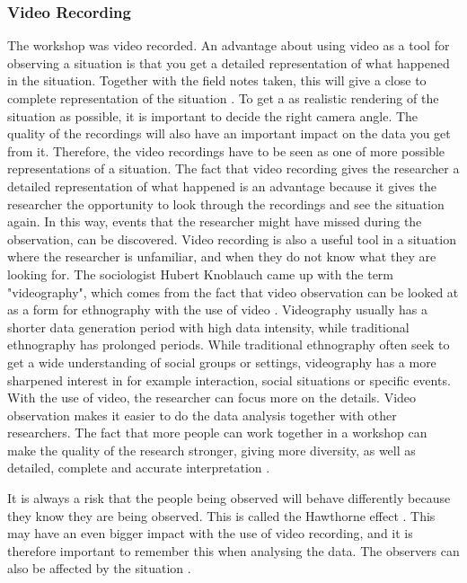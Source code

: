 \subsubsection{Video Recording}
The workshop was video recorded. An advantage about using video as a tool for observing a situation is that you get a detailed representation of what happened in the situation. Together with the field notes taken, this will give a close to complete representation of the situation \cite{tjora}. To get a as realistic rendering of the situation as possible, it is important to decide the right camera angle. The quality of the recordings will also have an important impact on the data you get from it. Therefore, the video recordings have to be seen as one of more possible representations of a situation.  The fact that video recording gives the researcher a detailed representation of what happened is an advantage because it gives the researcher the opportunity to look through the recordings and see the situation again. In this way, events that the researcher might have missed during the observation, can be discovered. Video recording is also a useful tool in a situation where the researcher is unfamiliar, and when they do not know what they are looking for. The sociologist Hubert Knoblauch came up with the term "videography", which comes from the fact that video observation can be looked at as a form for ethnography with the use of video \cite{tjora}. Videography usually has a shorter data generation period with high data intensity, while traditional ethnography has prolonged periods.  While traditional ethnography often seek to get a wide understanding of social groups or settings, videography has a more sharpened interest in for example interaction, social situations or specific events. With the use of video, the researcher can focus more on the details. Video observation makes it easier to do the data analysis together with other researchers. The fact that more people can work together in a workshop can make the quality of the research stronger, giving more diversity, as well as detailed, complete and accurate interpretation \cite{tjora}.

It is always a risk that the people being observed will behave differently because they know they are being observed. This is called the Hawthorne effect \cite{interview}. This may have an even bigger impact with the use of video recording, and it is therefore important to remember this when analysing the data. The observers can also be affected by the situation \cite{tjora}. 

